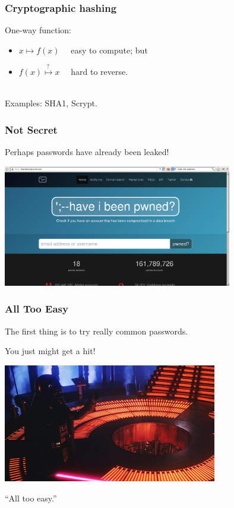\begin{frame}
  \frametitle{Cryptographic hashing}
  
    One-way function:
    \begin{itemize}
    \item $x \mapsto f(x)$ ~~easy to compute; but
      \item $f(x) \stackrel{?~}{\mapsto} x$ ~~hard to reverse.
    \end{itemize}~\\
    Examples: SHA1, Scrypt.

\end{frame}


\begin{frame}
\frametitle{Not Secret}
Perhaps passwords have already been leaked!

\begin{center}
	\includegraphics[width=0.75\textwidth]{images/haveibeenpwned.png}
\end{center}


\end{frame}


\begin{frame}
\frametitle{All Too Easy}

The first thing is to try really common passwords.

You just might get a hit!

\begin{center}
	\includegraphics[width=0.7\textwidth]{images/alltooeasy.jpg}
\end{center}

``All too easy.''

\end{frame}


